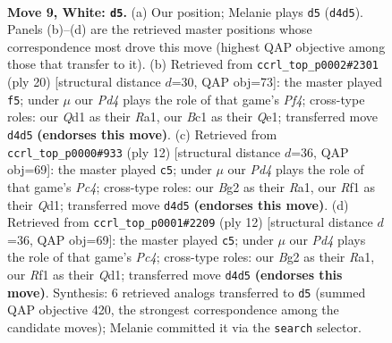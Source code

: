 \documentclass[11pt]{article}
\begin{document}
\clearpage

\begin{figure}[p]\centering
\begin{subfigure}{0.46\textwidth}\centering
\resizebox{\linewidth}{!}{%
\newchessgame
\chessboard[
  setfen={r1bq1rk1/pppn1pb1/3p1np1/4p2p/2PP4/2N2NP1/PP2PPBP/R1BQ1R1K w - - 0 9},
  showmover=false,
  pgfstyle=straightmove, color=movearrow, markmove={d4-d5}
]}
\caption{}
\end{subfigure}\hfill
\begin{subfigure}{0.46\textwidth}\centering
\resizebox{\linewidth}{!}{%
\newchessgame
\chessboard[
  setfen={r1bq1rk1/1p1n1pbp/2p2np1/p3p3/4PP2/2N2NP1/PPP3BP/R1B1QRK1 w - - 0 11},
  showmover=false,
  pgfstyle=straightmove, color=movearrow, markmove={f4-f5}
]}
\caption{}
\end{subfigure}
\\[4pt]
\begin{subfigure}{0.46\textwidth}\centering
\resizebox{\linewidth}{!}{%
\newchessgame
\chessboard[
  setfen={r1bq1rk1/pppnbppp/4pn2/3p4/2PP1B2/2N1PN2/PP3PPP/R2QKB1R w KQ - 1 7},
  showmover=false,
  pgfstyle=straightmove, color=movearrow, markmove={c4-c5}
]}
\caption{}
\end{subfigure}\hfill
\begin{subfigure}{0.46\textwidth}\centering
\resizebox{\linewidth}{!}{%
\newchessgame
\chessboard[
  setfen={r1bq1rk1/pppnbppp/4pn2/3p4/2PP1B2/2N1PN2/PP3PPP/R2QKB1R w KQ - 1 7},
  showmover=false,
  pgfstyle=straightmove, color=movearrow, markmove={c4-c5}
]}
\caption{}
\end{subfigure}
\caption{\textbf{Move 9, White: \texttt{d5}.} (a) Our position; Melanie plays \texttt{d5} (\texttt{d4d5}). Panels (b)--(d) are the retrieved master positions whose correspondence most drove this move (highest QAP objective among those that transfer to it). (b) Retrieved from \texttt{ccrl\_top\_p0002\#2301} (ply 20) [structural distance $d$=30, QAP obj=73]: the master played \texttt{f5}; under $\mu$ our \emph{Pd4} plays the role of that game's \emph{Pf4}; cross-type roles: our \emph{Q}d1 as their \emph{R}a1, our \emph{B}c1 as their \emph{Q}e1; transferred move \texttt{d4d5} \textbf{(endorses this move)}. (c) Retrieved from \texttt{ccrl\_top\_p0000\#933} (ply 12) [structural distance $d$=36, QAP obj=69]: the master played \texttt{c5}; under $\mu$ our \emph{Pd4} plays the role of that game's \emph{Pc4}; cross-type roles: our \emph{B}g2 as their \emph{R}a1, our \emph{R}f1 as their \emph{Q}d1; transferred move \texttt{d4d5} \textbf{(endorses this move)}. (d) Retrieved from \texttt{ccrl\_top\_p0001\#2209} (ply 12) [structural distance $d$=36, QAP obj=69]: the master played \texttt{c5}; under $\mu$ our \emph{Pd4} plays the role of that game's \emph{Pc4}; cross-type roles: our \emph{B}g2 as their \emph{R}a1, our \emph{R}f1 as their \emph{Q}d1; transferred move \texttt{d4d5} \textbf{(endorses this move)}. Synthesis: 6 retrieved analogs transferred to \texttt{d5} (summed QAP objective 420, the strongest correspondence among the candidate moves); Melanie committed it via the \texttt{search} selector.}
\label{fig:thought-m16}
\end{figure}
\end{document}
